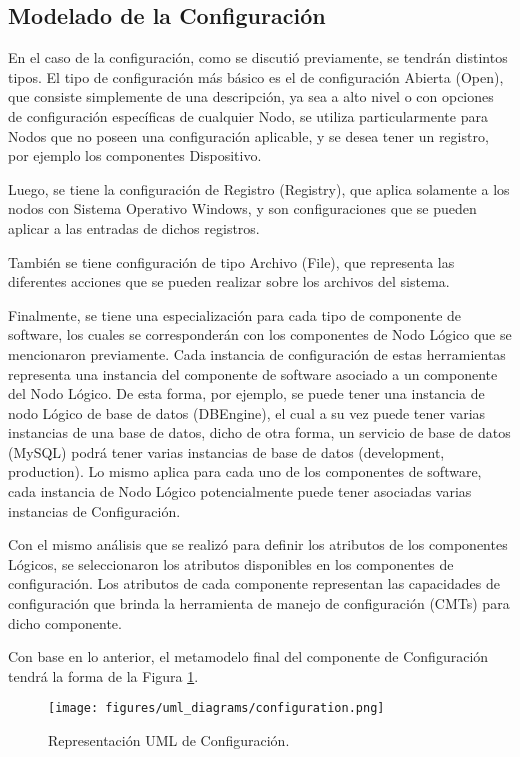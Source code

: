 \subsection{Modelado de la Configuración}
En el caso de la configuración, como se discutió previamente, se tendrán distintos tipos. El tipo de configuración más básico es el de configuración Abierta (Open), que consiste simplemente de una descripción, ya sea a alto nivel o con opciones de configuración específicas de cualquier Nodo, se utiliza particularmente para Nodos que no poseen una configuración aplicable, y se desea tener un registro, por ejemplo los componentes Dispositivo.

Luego, se tiene la configuración de Registro (Registry), que aplica solamente a los nodos con Sistema Operativo Windows, y son configuraciones que se pueden aplicar a las entradas de dichos registros.

También se tiene configuración de tipo Archivo (File), que representa las diferentes acciones que se pueden realizar sobre los archivos del sistema.

Finalmente, se tiene una especialización para cada tipo de componente de software, los cuales se corresponderán con los componentes de Nodo Lógico que se mencionaron previamente. 
Cada instancia de configuración de estas herramientas representa una instancia del componente de software asociado a un componente del Nodo Lógico. De esta forma, por ejemplo, se puede tener una instancia de nodo Lógico de base de datos (DBEngine), el cual a su vez puede tener varias instancias de una base de datos, dicho de otra forma, un servicio de base de datos (MySQL) podrá tener varias instancias de base de datos (development, production).
Lo mismo aplica para cada uno de los componentes de software, cada instancia de Nodo Lógico potencialmente puede tener asociadas varias instancias de Configuración.

Con el mismo análisis que se realizó para definir los atributos de los componentes Lógicos, se seleccionaron los atributos disponibles en los componentes de configuración. Los atributos de cada componente representan las capacidades de configuración que brinda la herramienta de manejo de configuración (CMTs) para dicho componente.

Con base en lo anterior, el metamodelo final del componente de Configuración tendrá la forma de la Figura \ref{fig:uml:configuration}.

\begin{figure}[htbp]
    \centering
    \texttt{[image: figures/uml\_diagrams/configuration.png]}
    \caption{Representación UML de Configuración.}
    \label{fig:uml:configuration}
\end{figure}


